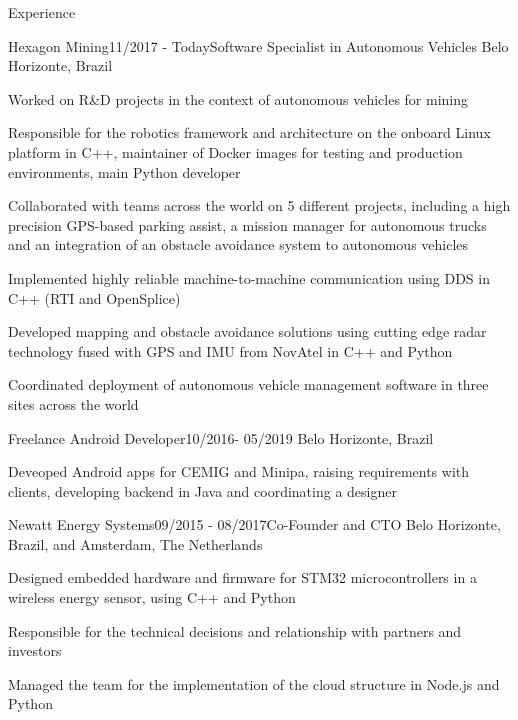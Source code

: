 \documentclass[14pt, a4paper]{resume} %
\begin{document}
\begin{rSection}{Experience}


\begin{rSubsection}{Hexagon Mining}{11/2017 - Today}{\normalfont Software Specialist in Autonomous Vehicles}{ \normalfont Belo Horizonte, Brazil}
	\item Worked on R\&D projects in the context of autonomous vehicles for mining
 	\item Responsible for the robotics framework and architecture on the onboard Linux platform in C++, maintainer of Docker images for testing and production environments, main Python developer
 	\item Collaborated with teams across the world on 5 different projects, including a high precision GPS-based parking assist, a mission manager for autonomous trucks and an integration of an obstacle avoidance system to autonomous vehicles 
 	\item Implemented highly reliable machine-to-machine communication using DDS in C++ (RTI and OpenSplice)
 	\item Developed mapping and obstacle avoidance solutions using cutting edge radar technology fused with GPS and IMU from NovAtel in C++ and Python
 	\item Coordinated deployment of autonomous vehicle management software in three sites across the world
\end{rSubsection}

\begin{rSubsection}{Freelance Android Developer}{10/2016- 05/2019}{\normalfont}{ \normalfont Belo Horizonte, Brazil}
	\item Deveoped Android apps for CEMIG and Minipa, raising requirements with clients, developing backend in Java and coordinating a designer
\end{rSubsection}

\begin{rSubsection}{Newatt Energy Systems}{09/2015 - 08/2017}{\normalfont Co-Founder and CTO}{ \normalfont Belo Horizonte, Brazil, and Amsterdam, The Netherlands}
 	\item Designed embedded hardware and firmware for STM32 microcontrollers in a wireless energy sensor, using C++ and Python
 	\item Responsible for the technical decisions and relationship with partners and investors
 	\item Managed the team for the implementation of the cloud structure in Node.js and Python


\end{rSubsection}
\end{rSection}
\end{document}
